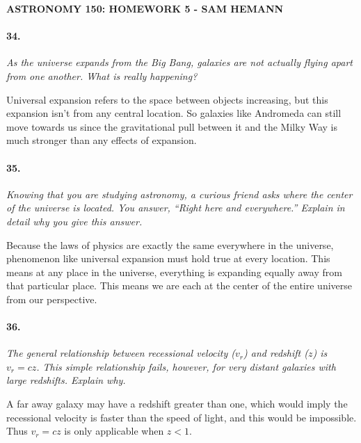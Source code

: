 \documentclass[letterpaper,11pt]{article}
\begin{document}
\begin{center}
	\bf
	ASTRONOMY 150: HOMEWORK 5 - SAM HEMANN
\end{center}



\paragraph{34.}
\it
As the universe expands from the Big Bang, galaxies are not actually flying apart from one another. What is really happening?
\smallskip
	\par
	\normalfont
	Universal expansion refers to the space between objects increasing, but this expansion isn't from any central location. So galaxies like Andromeda can still move towards us since the gravitational pull between it and the Milky Way is much stronger than any effects of expansion.



\paragraph{35.}
\it
Knowing that you are studying astronomy, a curious friend asks where the center of the universe is located. You answer, “Right here and everywhere.” Explain in detail why you give this answer.
\smallskip
	\par
	\normalfont
	Because the laws of physics are exactly the same everywhere in the universe, phenomenon like universal expansion must hold true at every location. This means at any place in the universe, everything is expanding equally away from that particular place. This means we are each at the center of the entire universe from our perspective.



\paragraph{36.}
\it
The general relationship between recessional velocity ($v_r$) and redshift ($z$) is $v_r = cz$. This simple relationship fails, however, for very distant galaxies with large redshifts. Explain why.
\smallskip
	\par
	\normalfont
	A far away galaxy may have a redshift greater than one, which would imply the recessional velocity is faster than the speed of light, and this would be impossible. Thus $v_r = cz$ is only applicable when $z < 1$.
\end{document}
